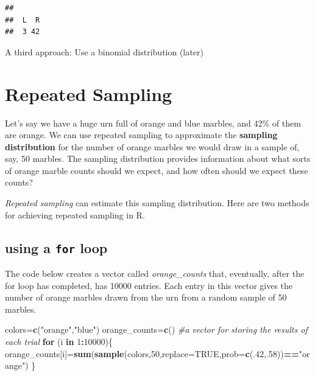 \documentclass[
]{book}
\newenvironment{Shaded}{\begin{snugshade}}{\end{snugshade}}
\newcommand{\AttributeTok}[1]{\textcolor[rgb]{0.13,0.29,0.53}{#1}}
\newcommand{\CommentTok}[1]{\textcolor[rgb]{0.56,0.35,0.01}{\textit{#1}}}
\newcommand{\ConstantTok}[1]{\textcolor[rgb]{0.56,0.35,0.01}{#1}}
\newcommand{\ControlFlowTok}[1]{\textcolor[rgb]{0.13,0.29,0.53}{\textbf{#1}}}
\newcommand{\DecValTok}[1]{\textcolor[rgb]{0.00,0.00,0.81}{#1}}
\newcommand{\FunctionTok}[1]{\textcolor[rgb]{0.13,0.29,0.53}{\textbf{#1}}}
\newcommand{\NormalTok}[1]{#1}
\newcommand{\OtherTok}[1]{\textcolor[rgb]{0.56,0.35,0.01}{#1}}
\newcommand{\SpecialCharTok}[1]{\textcolor[rgb]{0.81,0.36,0.00}{\textbf{#1}}}
\newcommand{\StringTok}[1]{\textcolor[rgb]{0.31,0.60,0.02}{#1}}
\theoremstyle{definition}
\theoremstyle{definition}
\theoremstyle{definition}
\theoremstyle{definition}
\theoremstyle{remark}
\begin{document}
\begin{verbatim}
## 
##  L  R 
##  3 42
\end{verbatim}

A third approach: Use a binomial distribution (later)

\section{Repeated Sampling}\label{repeated-sampling}

Let's say we have a huge urn full of orange and blue marbles, and 42\% of them are orange. We can use repeated sampling to approximate the \textbf{sampling distribution} for the number of orange marbles we would draw in a sample of, say, 50 marbles.
The sampling distribution provides information about what sorts of orange marble counts should we expect, and how often should we expect these counts?

\emph{Repeated sampling} can estimate this sampling distribution. Here are two methods for achieving repeated sampling in R.

\subsection{\texorpdfstring{using a \texttt{for} loop}{using a for loop}}\label{using-a-for-loop}

The code below creates a vector called \emph{orange\_counts} that, eventually, after the for loop has completed, has 10000 entries. Each entry in this vector gives the number of orange marbles drawn from the urn from a random sample of 50 marbles.

\begin{Shaded}
\begin{Highlighting}[]
\NormalTok{colors}\OtherTok{=}\FunctionTok{c}\NormalTok{(}\StringTok{"orange"}\NormalTok{,}\StringTok{"blue"}\NormalTok{)}
\NormalTok{orange\_counts}\OtherTok{=}\FunctionTok{c}\NormalTok{() }\CommentTok{\#a vector for storing the results of each trial}
\ControlFlowTok{for}\NormalTok{ (i }\ControlFlowTok{in} \DecValTok{1}\SpecialCharTok{:}\DecValTok{10000}\NormalTok{)\{}
\NormalTok{  orange\_counts[i]}\OtherTok{=}\FunctionTok{sum}\NormalTok{(}\FunctionTok{sample}\NormalTok{(colors,}\DecValTok{50}\NormalTok{,}\AttributeTok{replace=}\ConstantTok{TRUE}\NormalTok{,}\AttributeTok{prob=}\FunctionTok{c}\NormalTok{(.}\DecValTok{42}\NormalTok{,.}\DecValTok{58}\NormalTok{))}\SpecialCharTok{==}\StringTok{"orange"}\NormalTok{)}
\NormalTok{\}}
\end{Highlighting}
\end{Shaded}
\end{document}
